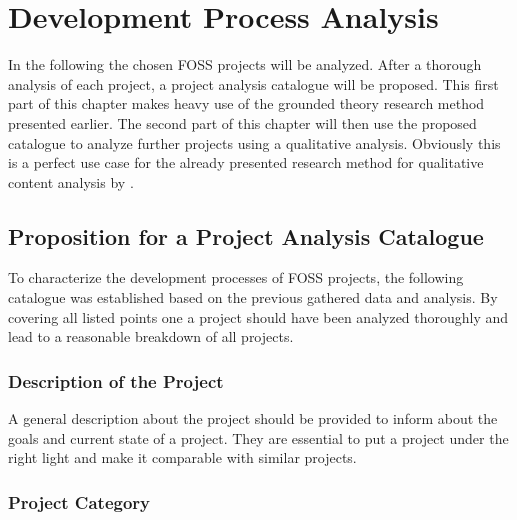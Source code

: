 \chapter{Development Process Analysis} %
\label{chap:analysis}

In the following the chosen \ac{FOSS} projects will be analyzed. After a
thorough analysis of each project, a project analysis catalogue will be
proposed. This first part of this chapter makes heavy use of the grounded
theory research method presented earlier. The second part of this chapter will
then use the proposed catalogue to analyze further projects using a qualitative
analysis. Obviously this is a perfect use case for the already presented
research method for qualitative content analysis by \textcite{Mayring2000}.













\section{Proposition for a Project Analysis Catalogue} %

To characterize the development processes of \ac{FOSS} projects, the following
catalogue was established based on the previous gathered data and analysis. By
covering all listed points one a project should have been analyzed thoroughly
and lead to a reasonable breakdown of all projects.

\subsection{Description of the Project}

A general description about the project should be provided to inform about the
goals and current state of a project. They are essential to put a project under
the right light and make it comparable with similar projects.

\subsection{Project Category}

